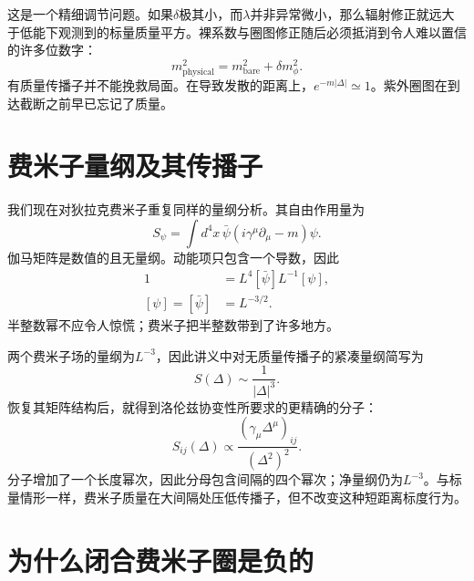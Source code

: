 这是一个精细调节问题。如果\(\delta\)极其小，而\(\lambda\)并非异常微小，那么辐射修正就远大于低能下观测到的标量质量平方。裸系数与圈图修正随后必须抵消到令人难以置信的许多位数字：
\begin{equation}
m_{\mathrm{physical}}^2
=m_{\mathrm{bare}}^2+\delta m_\phi^2.
\end{equation}
有质量传播子并不能挽救局面。在导致发散的距离上，\(e^{-m|\Delta|}\simeq1\)。紫外圈图在到达截断之前早已忘记了质量。

\section{费米子量纲及其传播子}

我们现在对狄拉克费米子重复同样的量纲分析。其自由作用量为
\begin{equation}
S_\psi=\int d^4x\,
\bar\psi\left(i\gamma^\mu\partial_\mu-m\right)\psi.
\end{equation}
伽马矩阵是数值的且无量纲。动能项只包含一个导数，因此
\begin{align}
1
&=L^4[\bar\psi]L^{-1}[\psi],\\
[\psi]=[\bar\psi]&=L^{-3/2}.
\end{align}
半整数幂不应令人惊慌；费米子把半整数带到了许多地方。

\begin{classroomqa}
\end{classroomqa}

两个费米子场的量纲为\(L^{-3}\)，因此讲义中对无质量传播子的紧凑量纲简写为
\begin{equation}
S(\Delta)\sim\frac{1}{|\Delta|^3}.
\end{equation}
恢复其矩阵结构后，就得到洛伦兹协变性所要求的更精确的分子：
\begin{equation}
S_{ij}(\Delta)
\propto
\frac{\left(\gamma_\mu\Delta^\mu\right)_{ij}}
{\left(\Delta^2\right)^2}.
\end{equation}
分子增加了一个长度幂次，因此分母包含间隔的四个幂次；净量纲仍为\(L^{-3}\)。与标量情形一样，费米子质量在大间隔处压低传播子，但不改变这种短距离标度行为。

\section{为什么闭合费米子圈是负的}

